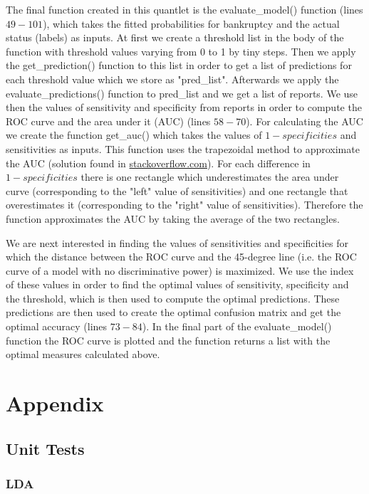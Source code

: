\documentclass{article}
\begin{document}
The final function created in this quantlet is the evaluate\_model() function (lines $49-101$), which takes the fitted probabilities for bankruptcy and the actual status (labels) as inputs. At first we create a threshold list in the body of the function with threshold values varying from 0 to 1 by tiny steps. Then we apply the get\_prediction() function to this list in order to get a list of predictions for each threshold value which we store as "pred\_list". Afterwards we apply the evaluate\_predictions() function to pred\_list and we get a list of reports. We use then the values of sensitivity and specificity from reports in order to compute the ROC curve and the area under it (AUC) (lines $58-70$). For calculating the AUC we create the function get\_auc() which takes the values of $1-specificities$ and sensitivities as inputs. This function uses the trapezoidal method to approximate the AUC (solution found in \href{https://stackoverflow.com/questions/4954507/calculate-the-area-under-a-curve}{stackoverflow.com}). For each difference in $1-specificities$ there is one rectangle which underestimates the area under curve (corresponding to the "left" value of sensitivities) and one rectangle that overestimates it (corresponding to the "right" value of sensitivities). Therefore the function approximates the AUC by taking the average of the two rectangles. 

We are next interested in finding the values of sensitivities and specificities for which the distance between the ROC curve and the 45-degree line (i.e. the ROC curve of a model with no discriminative power) is maximized. We use the index of these values in order to find the optimal values of sensitivity, specificity and the threshold, which is then used to compute the optimal predictions. These predictions are then used to create the optimal confusion matrix and get the optimal accuracy (lines $73-84$). In the final part of the evaluate\_model() function the ROC curve is plotted and the function returns a list with the optimal measures calculated above.
 
\section{Appendix}

\subsection{Unit Tests}
\subsubsection{LDA}
\end{document}
